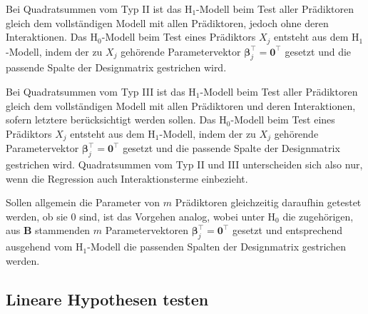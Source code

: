 Bei Quadratsummen vom Typ II ist das $\text{H}_{1}$-Modell beim Test aller Prädiktoren gleich dem vollständigen Modell mit allen Prädiktoren, jedoch ohne deren Interaktionen. Das $\text{H}_{0}$-Modell beim Test eines Prädiktors $X_{j}$ entsteht aus dem $\text{H}_{1}$-Modell, indem der zu $X_{j}$ gehörende Parametervektor $\bm{\beta}_{j}^{\top} = \bm{0}^{\top}$ gesetzt und die passende Spalte der Designmatrix gestrichen wird.

Bei Quadratsummen vom Typ III ist das $\text{H}_{1}$-Modell beim Test aller Prädiktoren gleich dem vollständigen Modell mit allen Prädiktoren und deren Interaktionen, sofern letztere berücksichtigt werden sollen. Das $\text{H}_{0}$-Modell beim Test eines Prädiktors $X_{j}$ entsteht aus dem $\text{H}_{1}$-Modell, indem der zu $X_{j}$ gehörende Parametervektor $\bm{\beta}_{j}^{\top} = \bm{0}^{\top}$ gesetzt und die passende Spalte der Designmatrix gestrichen wird. Quadratsummen vom Typ II und III unterscheiden sich also nur, wenn die Regression auch Interaktionsterme einbezieht.

Sollen allgemein die Parameter von $m$ Prädiktoren gleichzeitig daraufhin getestet werden, ob sie $0$ sind, ist das Vorgehen analog, wobei unter $\text{H}_{0}$ die zugehörigen, aus $\bm{B}$ stammenden $m$ Parametervektoren $\bm{\beta}_{j}^{\top} = \bm{0}^{\top}$ gesetzt und entsprechend ausgehend vom $\text{H}_{1}$-Modell die passenden Spalten der Designmatrix gestrichen werden.


\subsection{Lineare Hypothesen testen}
\label{sec:multALMtest}

